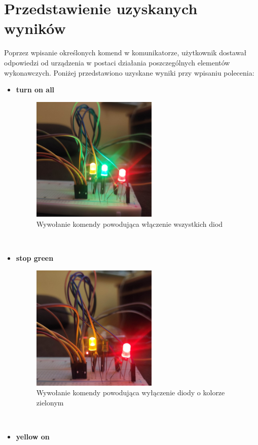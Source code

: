 \newpage
\section{Przedstawienie uzyskanych wyników}
Poprzez wpisanie określonych komend w komunikatorze, użytkownik dostawał odpowiedzi od urządzenia w postaci działania poszczególnych elementów wykonawczych. Poniżej przedstawiono uzyskane wyniki przy wpisaniu polecenia:
\begin{itemize}  
	\item \textbf{turn on all}
	\begin{figure}[htbp]
	\centering
	\includegraphics[width=0.4\linewidth, height=6cm]{"obrazy/turnonall.jpg"}
	\caption{Wywołanie komendy powodująca włączenie wszystkich diod}
	\label{fig:51}
\end{figure}
	\\
	\item \textbf{stop green}
	\begin{figure}[htbp]
	\centering
	\includegraphics[width=0.4\linewidth, height=6cm]{"obrazy/stopgreen.jpg"}
	\caption{Wywołanie komendy powodująca wyłączenie diody o kolorze zielonym}
	\label{fig:52}
	\end{figure}
	\\
\newpage
\item \textbf{yellow on}
	\begin{figure}[htbp]

\end{figure}
\end{itemize}
